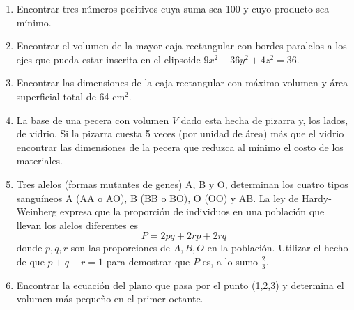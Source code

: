 \documentclass[fleqn, 12pt]{article}
\begin{document}
\begin{enumerate}
        
        \item Encontrar tres números positivos cuya suma sea 100 y cuyo producto sea mínimo.
    

        \item Encontrar el volumen de la mayor caja rectangular con bordes paralelos a los ejes que pueda estar inscrita en el elipsoide $ 9x^2 + 36y^2 + 4z^2 = 36 $.
        

        \item Encontrar las dimensiones de la caja rectangular con máximo volumen y área superficial total de 64 cm$ ^2 $.
        

        \item La base de una pecera con volumen $ V $ dado esta hecha de pizarra y, los lados, de vidrio. Si la pizarra cuesta 5 veces (por unidad de área) más que el vidrio encontrar las dimensiones de la pecera que reduzca al mínimo el costo de los materiales.
        

        \item Tres alelos (formas mutantes de genes) A, B y O, determinan los cuatro tipos sanguíneos A (AA o AO), B (BB o BO), O (OO) y AB. La ley de Hardy-Weinberg expresa que la proporción de individuos en una población que llevan los alelos diferentes es
        $$ P = 2pq + 2rp + 2rq $$
        donde $ p, q, r $ son las proporciones de $ A, B, O $ en la población. Utilizar el hecho de que $ p + q + r = 1 $ para demostrar que $ P $ es, a lo sumo $ \frac{2}{3} $.


        \item Encontrar la ecuación del plano que pasa por el punto (1,2,3) y determina el volumen más pequeño en el primer octante.
        
    \end{enumerate}
\end{document}
